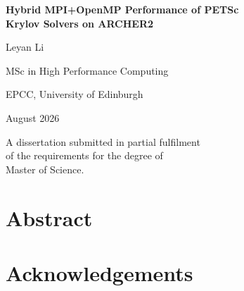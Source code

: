 \begin{titlepage}
\centering
\vspace*{2cm}
{\LARGE\bfseries Hybrid MPI+OpenMP Performance of PETSc\\[0.3em]
Krylov Solvers on ARCHER2\par}
\vspace{2cm}
{\Large Leyan Li\par}
\vspace{1cm}
{\large MSc in High Performance Computing\par}
{\large EPCC, University of Edinburgh\par}
\vspace{1cm}
{\large August 2026\par}
\vfill
{\normalsize A dissertation submitted in partial fulfilment\\
of the requirements for the degree of\\
Master of Science.\par}
\end{titlepage}
\clearpage

\chapter*{Abstract}

\chapter*{Acknowledgements}
